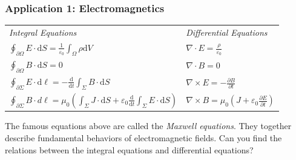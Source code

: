 \documentclass[11pt, t]{beamer}
\renewcommand{\emph}[1]{{\color{Turquoise3}\textsl{#1}}}
\begin{document}
\begin{frame}
    \frametitle{Application 1: Electromagnetics}
    \begin{tabular}{l l}

        \textit{Integral Equations}                                                                                                                                                                                & \textit{Differential Equations}                                                             \\
        $\displaystyle\oint_{\partial \Omega} {E} \cdot \mathrm{d} {S}=\frac{1}{\varepsilon_{0}} \int_{\Omega} \rho \mathrm{d} V$                                                                                  & $\displaystyle\nabla \cdot {E}=\frac{\rho}{\varepsilon_{0}}$                                \\
        $\displaystyle\oint_{\partial \Omega} {B} \cdot \mathrm{d} {S}=0$                                                                                                                                          & $\displaystyle\nabla \cdot {B}=0$                                                           \\
        $\displaystyle\oint_{\partial \Sigma} {E} \cdot \mathrm{d} \ell=-\frac{\mathrm{d}}{\mathrm{d} t} \int_{\Sigma} {B} \cdot \mathrm{d} {S}$                                                                   & $\displaystyle\nabla \times {E}=-\frac{\partial {B}}{\partial t}$                           \\
        $\displaystyle\oint_{\partial \Sigma}{B} \cdot {d} \ell=\mu_{0}\left(\int_{\Sigma} {J} \cdot \mathrm{d} {S}+\varepsilon_{0} \frac{\mathrm{d}}{\mathrm{d} t} \int_{\Sigma} {E} \cdot \mathrm{d} {S}\right)$ & $\nabla \times {B}=\mu_{0}\left({J}+\varepsilon_{0} \frac{\partial {E}}{\partial t}\right)$
        \\
    \end{tabular}
    \vspace{10pt}

    The famous equations above are called the \emph{Maxwell equations}. They together describe fundamental behaviors of electromagnetic fields. Can you find the relations between the integral equations and differential equations?
\end{frame}
\end{document}

